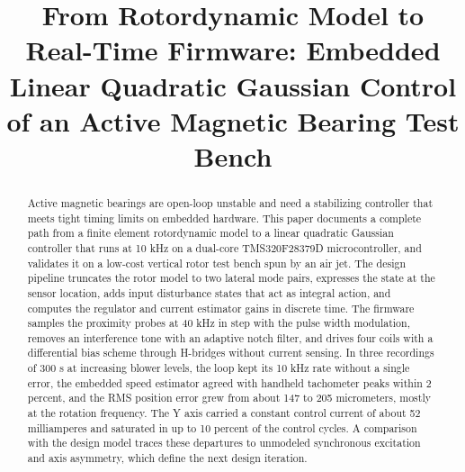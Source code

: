 \documentclass[conference]{IEEEtran}
\begin{document}

\title{From Rotordynamic Model to Real-Time Firmware: Embedded Linear Quadratic Gaussian Control of an Active Magnetic Bearing Test Bench}

\author{
\and
{}
}

\maketitle

\begin{abstract}
Active magnetic bearings are open-loop unstable and need a stabilizing controller that meets tight timing limits on embedded hardware. This paper documents a complete path from a finite element rotordynamic model to a linear quadratic Gaussian controller that runs at 10 kHz on a dual-core TMS320F28379D microcontroller, and validates it on a low-cost vertical rotor test bench spun by an air jet. The design pipeline truncates the rotor model to two lateral mode pairs, expresses the state at the sensor location, adds input disturbance states that act as integral action, and computes the regulator and current estimator gains in discrete time. The firmware samples the proximity probes at 40 kHz in step with the pulse width modulation, removes an interference tone with an adaptive notch filter, and drives four coils with a differential bias scheme through H-bridges without current sensing. In three recordings of 300 s at increasing blower levels, the loop kept its 10 kHz rate without a single error, the embedded speed estimator agreed with handheld tachometer peaks within 2 percent, and the RMS position error grew from about 147 to 205 micrometers, mostly at the rotation frequency. The Y axis carried a constant control current of about 52 milliamperes and saturated in up to 10 percent of the control cycles. A comparison with the design model traces these departures to unmodeled synchronous excitation and axis asymmetry, which define the next design iteration.
\end{abstract}
\end{document}
